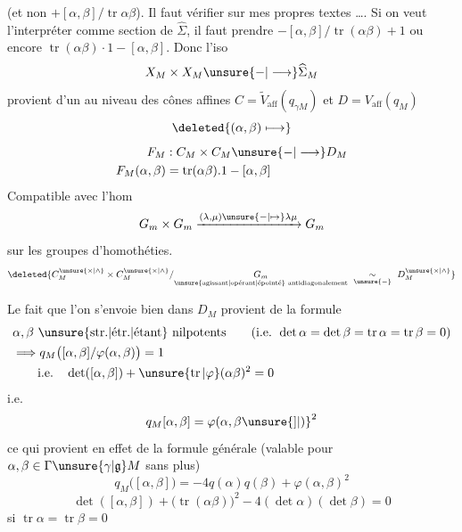 (et non $+[\alpha,\beta]/\operatorname{tr}\alpha\beta$). Il faut vérifier sur mes propres textes  \ldots. Si on veut l'interpréter comme section de $\widehat\Sigma$, il faut prendre $-[\alpha,\beta]/\operatorname{tr}(\alpha\beta)+1$ ou encore $\operatorname{tr}(\alpha\beta)\cdot1-[\alpha,\beta]$. Donc l'iso 
\[
X_M\times X_M\unsure{-|\longrightarrow}\widehat{\Sigma}_M
\]
 provient d'un    au niveau des cônes  affines $C=\widetilde V_{\mathrm{aff}}(q_{\gamma M})$ et $D=V_{\mathrm{aff}}(q_M)$ 
\[
\deleted{(\alpha,\beta)\longmapsto}
\]
\[
\begin{aligned}
F_M&:C_M\times C_M\unsure{-|\longrightarrow}D_M\\
F_M(\alpha,\beta)&=\operatorname{tr}(\alpha\beta).1-[\alpha,\beta]
\end{aligned}
\]
Compatible avec l'hom
\[
G_m\times G_m\xrightarrow{(\lambda,\mu)\unsure{-|\mapsto}\lambda\mu}G_m
\]
sur les groupes d'homothéties. 
\[
\deleted{C_M^{\unsure{\times|\wedge}}\times C_M^{\unsure{\times|\wedge}}/\underset{\text{\unsure{agissant|opérant|épointé} antidiagonalement}}{G_m}\ \underset{\unsure{-}}{\sim}\ D_M^{\unsure{\times|\wedge}}}
\]

Le fait que l'on s'envoie bien dans $D_M$ provient de la formule
\[
\begin{aligned}
&\alpha,\beta\ \text{\unsure{str.|étr.|étant} nilpotents}\qquad(\text{i.e. }\det\alpha=\det\beta=\operatorname{tr}\alpha=\operatorname{tr}\beta=0)\\
&\Longrightarrow q_M\bigl([\alpha,\beta]/\varphi(\alpha,\beta)\bigr)=1\\
&\hspace{2em}\text{i.e.}\quad\det([\alpha,\beta])+\unsure{\operatorname{tr}|\varphi}(\alpha\beta)^2=0
\end{aligned}
\]
i.e.
\[
q_M[\alpha,\beta]=\varphi(\alpha,\beta{\unsure{]|)}}^2
\]
ce qui provient en effet de la formule générale (valable pour $\alpha,\beta\in\Gamma\unsure{\gamma|\mathfrak g}M$ sans plus)
\[
q_M\bigl([\alpha,\beta]\bigr)=-4q(\alpha)q(\beta)+\varphi(\alpha,\beta)^2
\]
\[
\det([\alpha,\beta])+\bigl(\operatorname{tr}(\alpha\beta)\bigr)^2-4(\det\alpha)(\det\beta)=0\tag*{(0)}
\]
si $\operatorname{tr}\alpha=\operatorname{tr}\beta=0$

